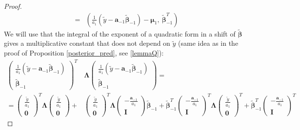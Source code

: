 \documentclass[10pt,fleqn]{amsart}
\theoremstyle{definition}
\theoremstyle{remark}
\numberwithin{equation}{section}
\newcommand{\aaa}{\boldsymbol{a}}
\newcommand{\bbeta}{\boldsymbol{\beta}}
\newcommand{\mmu}{\boldsymbol{\mu}}
\newcommand{\LLambda}{\boldsymbol{\Lambda}}
\newcommand{\bbetatilde}{\widetilde{\bbeta}}
\newcommand{\ytilde}{\widetilde{y}}
\begin{document}
\begin{proof}
\begin{equation*}
\begin{split}
    =&\left(\frac{1}{a_1}\left(\ytilde-\aaa_{-1}\bbetatilde_{-1}\right)-\mmu_1,\ \bbetatilde_{-1}^T\right)
\end{split}\end{equation*}
We will use that the integral of the exponent of a quadratic form in a shift of $\bbetatilde$ gives a multiplicative constant that
does not depend on $\ytilde$
(same idea as in the proof of Proposition \ref{posterior_pred}, see \ref{lemmaQ}):
\begin{equation*}\begin{split}
    \left(\begin{matrix}\frac 1{a_1}\left(\ytilde-\aaa_{-1}\bbetatilde_{-1}\right)\\\bbetatilde_{-1}\end{matrix}\right)^T
    &\LLambda
    \left(\begin{matrix}\frac 1{a_1}\left(\ytilde-\aaa_{-1}\bbetatilde_{-1}\right)\\\bbetatilde_{-1}\end{matrix}\right)=\\
    =\left(\begin{matrix}\frac \ytilde{a_1}\\\boldsymbol{0}\end{matrix}\right)^T
    \LLambda
    \left(\begin{matrix}\frac \ytilde{a_1}\\\boldsymbol{0}\end{matrix}\right)+
    &\left(\begin{matrix}\frac \ytilde{a_1}\\\boldsymbol{0}\end{matrix}\right)^T
    \LLambda
    \left(\begin{matrix}-\frac {\aaa_{-1}}{a_1}\\\boldsymbol{I}\end{matrix}\right)\bbetatilde_{-1}+
    \bbetatilde_{-1}^T\left(\begin{matrix}-\frac {\aaa_{-1}}{a_1}\\\boldsymbol{I}\end{matrix}\right)^T
    \LLambda
    \left(\begin{matrix}\frac \ytilde{a_1}\\\boldsymbol{0}\end{matrix}\right)^T+
    \bbetatilde_{-1}^T\left(\begin{matrix}-\frac {\aaa_{-1}}{a_1}\\\boldsymbol{I}\end{matrix}\right)^T

\end{split}
\end{equation*}
\end{proof}
\end{document}
